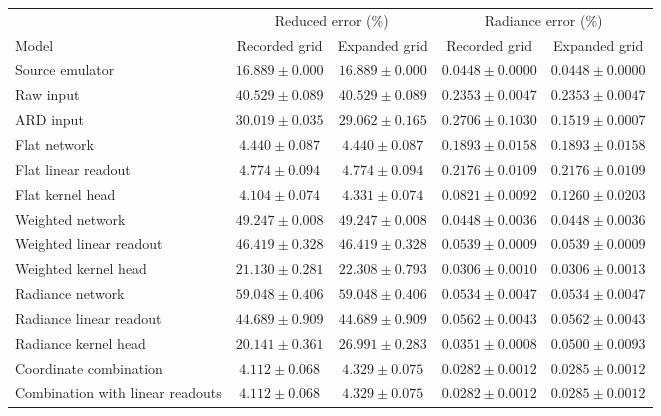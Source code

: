 \begin{tabular}{lcccc}
\toprule
& \multicolumn{2}{c}{Reduced error (\%)} & \multicolumn{2}{c}{Radiance error (\%)} \\
\cmidrule(lr){2-3}\cmidrule(lr){4-5}
Model & Recorded grid & Expanded grid & Recorded grid & Expanded grid \\
\midrule
Source emulator & $16.889\pm0.000$ & $16.889\pm0.000$ & $0.0448\pm0.0000$ & $0.0448\pm0.0000$ \\
Raw input & $40.529\pm0.089$ & $40.529\pm0.089$ & $0.2353\pm0.0047$ & $0.2353\pm0.0047$ \\
ARD input & $30.019\pm0.035$ & $29.062\pm0.165$ & $0.2706\pm0.1030$ & $0.1519\pm0.0007$ \\
Flat network & $4.440\pm0.087$ & $4.440\pm0.087$ & $0.1893\pm0.0158$ & $0.1893\pm0.0158$ \\
Flat linear readout & $4.774\pm0.094$ & $4.774\pm0.094$ & $0.2176\pm0.0109$ & $0.2176\pm0.0109$ \\
Flat kernel head & $4.104\pm0.074$ & $4.331\pm0.074$ & $0.0821\pm0.0092$ & $0.1260\pm0.0203$ \\
Weighted network & $49.247\pm0.008$ & $49.247\pm0.008$ & $0.0448\pm0.0036$ & $0.0448\pm0.0036$ \\
Weighted linear readout & $46.419\pm0.328$ & $46.419\pm0.328$ & $0.0539\pm0.0009$ & $0.0539\pm0.0009$ \\
Weighted kernel head & $21.130\pm0.281$ & $22.308\pm0.793$ & $0.0306\pm0.0010$ & $0.0306\pm0.0013$ \\
Radiance network & $59.048\pm0.406$ & $59.048\pm0.406$ & $0.0534\pm0.0047$ & $0.0534\pm0.0047$ \\
Radiance linear readout & $44.689\pm0.909$ & $44.689\pm0.909$ & $0.0562\pm0.0043$ & $0.0562\pm0.0043$ \\
Radiance kernel head & $20.141\pm0.361$ & $26.991\pm0.283$ & $0.0351\pm0.0008$ & $0.0500\pm0.0093$ \\
Coordinate combination & $4.112\pm0.068$ & $4.329\pm0.075$ & $0.0282\pm0.0012$ & $0.0285\pm0.0012$ \\
Combination with linear readouts & $4.112\pm0.068$ & $4.329\pm0.075$ & $0.0282\pm0.0012$ & $0.0285\pm0.0012$ \\
\bottomrule
\end{tabular}
